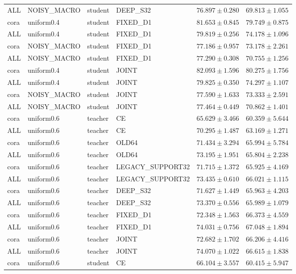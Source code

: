 \begin{longtable}{llllrr}
ALL & NOISY\_MACRO & student & DEEP\_S32 & $76.897 \pm 0.280$ & $69.813 \pm 1.055$ \\
cora & uniform0.4 & student & FIXED\_D1 & $81.653 \pm 0.845$ & $79.749 \pm 0.875$ \\
ALL & uniform0.4 & student & FIXED\_D1 & $79.819 \pm 0.256$ & $74.178 \pm 1.096$ \\
cora & NOISY\_MACRO & student & FIXED\_D1 & $77.186 \pm 0.957$ & $73.178 \pm 2.261$ \\
ALL & NOISY\_MACRO & student & FIXED\_D1 & $77.290 \pm 0.308$ & $70.755 \pm 1.256$ \\
cora & uniform0.4 & student & JOINT & $82.093 \pm 1.596$ & $80.275 \pm 1.756$ \\
ALL & uniform0.4 & student & JOINT & $79.825 \pm 0.350$ & $74.297 \pm 1.107$ \\
cora & NOISY\_MACRO & student & JOINT & $77.590 \pm 1.633$ & $73.333 \pm 2.591$ \\
ALL & NOISY\_MACRO & student & JOINT & $77.464 \pm 0.449$ & $70.862 \pm 1.401$ \\
cora & uniform0.6 & teacher & CE & $65.629 \pm 3.466$ & $60.359 \pm 5.644$ \\
ALL & uniform0.6 & teacher & CE & $70.295 \pm 1.487$ & $63.169 \pm 1.271$ \\
cora & uniform0.6 & teacher & OLD64 & $71.434 \pm 3.294$ & $65.994 \pm 5.784$ \\
ALL & uniform0.6 & teacher & OLD64 & $73.195 \pm 1.951$ & $65.804 \pm 2.238$ \\
cora & uniform0.6 & teacher & LEGACY\_SUPPORT32 & $71.715 \pm 1.372$ & $65.925 \pm 4.169$ \\
ALL & uniform0.6 & teacher & LEGACY\_SUPPORT32 & $73.435 \pm 0.610$ & $66.021 \pm 1.115$ \\
cora & uniform0.6 & teacher & DEEP\_S32 & $71.627 \pm 1.449$ & $65.963 \pm 4.203$ \\
ALL & uniform0.6 & teacher & DEEP\_S32 & $73.370 \pm 0.556$ & $65.989 \pm 1.079$ \\
cora & uniform0.6 & teacher & FIXED\_D1 & $72.348 \pm 1.563$ & $66.373 \pm 4.559$ \\
ALL & uniform0.6 & teacher & FIXED\_D1 & $74.031 \pm 0.756$ & $67.048 \pm 1.894$ \\
cora & uniform0.6 & teacher & JOINT & $72.682 \pm 1.702$ & $66.206 \pm 4.416$ \\
ALL & uniform0.6 & teacher & JOINT & $74.070 \pm 1.022$ & $66.615 \pm 1.838$ \\
cora & uniform0.6 & student & CE & $66.104 \pm 3.557$ & $60.415 \pm 5.947$ \\

\end{longtable}
